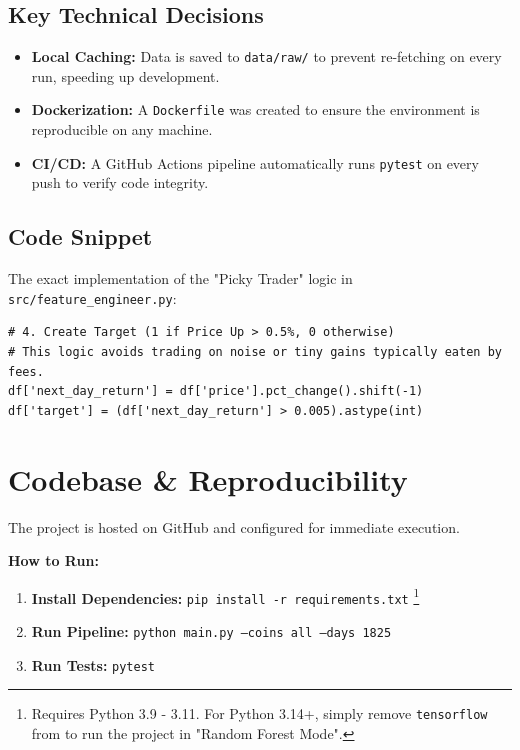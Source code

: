 \documentclass[11pt,a4paper]{article}
\begin{document}
\subsection{Key Technical Decisions}
\begin{itemize}
    \item \textbf{Local Caching:} Data is saved to \texttt{data/raw/} to prevent re-fetching on every run, speeding up development.
    \item \textbf{Dockerization:} A \texttt{Dockerfile} was created to ensure the environment is reproducible on any machine.
    \item \textbf{CI/CD:} A GitHub Actions pipeline automatically runs \texttt{pytest} on every push to verify code integrity.
\end{itemize}

\subsection{Code Snippet}
The exact implementation of the "Picky Trader" logic in \texttt{src/feature\_engineer.py}:

\begin{lstlisting}[caption={Target Generation Logic}]
# 4. Create Target (1 if Price Up > 0.5%, 0 otherwise)
# This logic avoids trading on noise or tiny gains typically eaten by fees.
df['next_day_return'] = df['price'].pct_change().shift(-1)
df['target'] = (df['next_day_return'] > 0.005).astype(int)
\end{lstlisting}

\section{Codebase \& Reproducibility}
\label{sec:codebase}

The project is hosted on GitHub and configured for immediate execution.

\textbf{How to Run:}
\begin{enumerate}
    \item \textbf{Install Dependencies:} \texttt{pip install -r requirements.txt} \footnote{Requires Python 3.9 - 3.11. For Python 3.14+, simply remove \texttt{tensorflow} from  to run the project in "Random Forest Mode".}
    \item \textbf{Run Pipeline:} \texttt{python main.py --coins all --days 1825}
    \item \textbf{Run Tests:} \texttt{pytest}
\end{enumerate}
\end{document}
